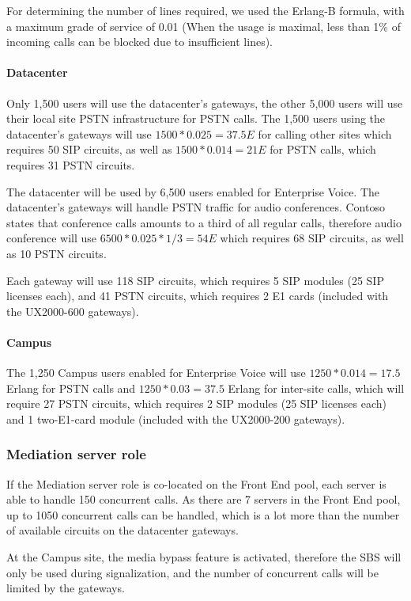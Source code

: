 	For determining the number of lines required, we used the Erlang-B formula, with a maximum grade of service of 0.01 (When the usage is maximal, less than 1\% of incoming calls can be blocked due to insufficient lines)\cite{qiao_robust_1998}.
	
	
	\paragraph{Datacenter}
	Only 1,500 users will use the datacenter's gateways, the other 5,000 users will use their local site PSTN infrastructure for PSTN calls. The 1,500 users using the datacenter's gateways will use $1500*0.025 = 37.5 E$ for calling other sites which requires 50 SIP circuits, as well as $1500*0.014 = 21 E$ for PSTN calls, which requires 31 PSTN circuits.
	
	The datacenter will be used by 6,500 users enabled for Enterprise Voice. The datacenter's gateways will handle PSTN traffic for audio conferences. Contoso states that conference calls amounts to a third of all regular calls, therefore audio conference will use $6500 * 0.025 * 1/3 = 54 E$ which requires 68 SIP circuits, as well as 10 PSTN circuits.
	
	Each gateway will use 118 SIP circuits, which requires 5 SIP modules (25 SIP licenses each), and 41 PSTN circuits, which requires 2 E1 cards (included with the UX2000-600 gateways).
	
	\paragraph{Campus}
	The 1,250 Campus users enabled for Enterprise Voice will use $1250 * 0.014 = 17.5$ Erlang for PSTN calls and $1250 * 0.03 = 37.5$ Erlang for inter-site calls, which will require 27 PSTN circuits, which requires 2 SIP modules (25 SIP licenses each) and 1 two-E1-card module (included with the UX2000-200 gateways).
	

\subsubsection{Mediation server role}
If the Mediation server role is co-located on the Front End pool, each server is able to handle 150 concurrent calls. As there are 7 servers in the Front End pool, up to 1050 concurrent calls can be handled, which is a lot more than the number of available circuits on the datacenter gateways.

At the Campus site, the media bypass feature is activated, therefore the SBS will only be used during signalization, and the number of concurrent calls will be limited by the gateways.

